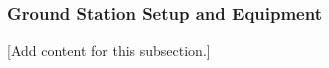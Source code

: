 
\subsubsection{Ground Station Setup and Equipment}
\label{subsubsec:design_12_1_ground_station_setup_equipment}

[Add content for this subsection.]
